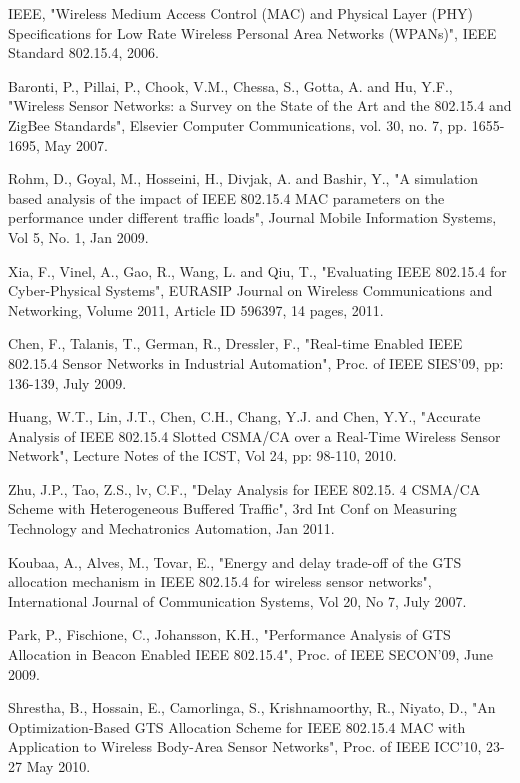 \documentclass[letterpaper]{sig-alternate-10pt}
\begin{document}
\begin{thebibliography}{1}

IEEE, "Wireless Medium Access Control (MAC) and Physical Layer (PHY) Specifications for Low Rate Wireless Personal Area Networks (WPANs)", IEEE Standard 802.15.4, 2006.

Baronti, P., Pillai, P., Chook, V.M., Chessa, S., Gotta, A. and Hu, Y.F., "Wireless Sensor Networks: a Survey on the State of the Art and the 802.15.4 and ZigBee Standards", Elsevier Computer Communications, vol. 30, no. 7, pp. 1655-1695, May 2007.

Rohm, D., Goyal, M., Hosseini, H., Divjak, A. and Bashir, Y., "A simulation based analysis of the impact of IEEE 802.15.4 MAC parameters on the performance under different traffic loads", Journal Mobile Information Systems, Vol 5, No. 1, Jan 2009.

Xia, F., Vinel, A., Gao, R., Wang, L. and Qiu, T., "Evaluating IEEE 802.15.4 for Cyber-Physical Systems", EURASIP Journal on Wireless Communications and Networking, Volume 2011, Article ID 596397, 14 pages, 2011.

Chen, F., Talanis, T., German, R., Dressler, F., "Real-time Enabled IEEE 802.15.4 Sensor Networks in Industrial Automation", Proc. of IEEE SIES'09, pp: 136-139, July 2009.

Huang, W.T., Lin, J.T., Chen, C.H., Chang, Y.J. and Chen, Y.Y., "Accurate Analysis of IEEE 802.15.4 Slotted CSMA/CA over a Real-Time Wireless Sensor Network", Lecture Notes of the ICST, Vol 24, pp: 98-110, 2010.

Zhu, J.P., Tao, Z.S., lv, C.F., "Delay Analysis for IEEE 802.15. 4 CSMA/CA Scheme with Heterogeneous Buffered Traffic", 3rd Int Conf on Measuring Technology and Mechatronics Automation, Jan 2011.

Koubaa, A., Alves, M., Tovar, E., "Energy and delay trade-off of the GTS allocation mechanism in IEEE 802.15.4 for wireless sensor networks", International Journal of Communication Systems, Vol 20, No 7, July 2007.

Park, P., Fischione, C., Johansson, K.H., "Performance Analysis of GTS Allocation in Beacon Enabled IEEE 802.15.4", Proc. of IEEE SECON'09, June 2009.

Shrestha, B., Hossain, E., Camorlinga, S., Krishnamoorthy, R., Niyato, D., "An Optimization-Based GTS Allocation Scheme for IEEE 802.15.4 MAC with Application to Wireless Body-Area Sensor Networks", Proc. of IEEE ICC'10, 23-27 May 2010.


\end{thebibliography}
\end{document}
